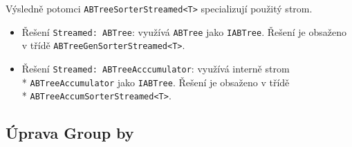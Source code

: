 Výsledně potomci \texttt{ABTreeSorterStreamed<T>} specializují použitý strom.
\begin{itemize}
\item Řešení \texttt{Streamed: ABTree}: využívá \texttt{ABTree} jako \texttt{IABTree}.
Řešení je obsaženo v třídě \texttt{ABTreeGenSorterStreamed<T>}.
\item Řešení \texttt{Streamed: ABTreeAcccumulator}: využívá interně strom\\* \texttt{ABTreeAccumulator} jako \texttt{IABTree}.
Řešení je obsaženo v třídě\\* \texttt{ABTreeAccumSorterStreamed<T>}.
\end{itemize}

\subsection{Úprava Group by}

